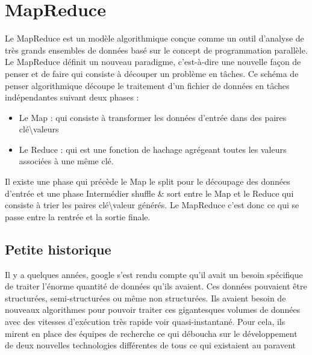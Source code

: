 \section{MapReduce}



Le MapReduce est un modèle algorithmique conçue comme un outil d’analyse de très grands ensembles de données basé sur le concept de programmation parallèle. Le MapReduce définit un nouveau paradigme, c’est-à-dire une nouvelle façon de penser et de faire qui consiste à découper un problème en tâches. Ce schéma de penser algorithmique découpe le traitement d’un fichier de données en tâches indépendantes suivant deux phases :  
\begin{itemize}
    \item Le Map : qui consiste à transformer les données d’entrée dans des paires clé\textbackslash valeurs
    \item Le Reduce : qui est une fonction de hachage agrégeant toutes les valeurs associées à une même clé. 
\end{itemize}

Il existe une phase qui précède le Map le split pour le découpage des données d’entrée et une phase Intermédier shuffle \& sort entre le Map et le Reduce qui consiste à trier les paires clé\textbackslash valeur générés. Le MapReduce c’est donc ce qui se passe entre la rentrée et la sortie finale. \cite{chokogoue_livre_nodate, sardar_partition_2018}

\subsection{Petite historique} 

Il y a quelques années, google s’est rendu compte qu’il avait un besoin spécifique de traiter l’énorme quantité de données qu’ils avaient. Ces données pouvaient être structurées, semi-structurées ou même non structurées. Ils avaient besoin de nouveaux algorithmes pour pouvoir traiter ces gigantesques volumes de données avec des vitesses d’exécution très rapide voir quasi-instantané. Pour cela, ils mirent en place des équipes de recherche ce qui déboucha sur le développement de deux nouvelles technologies différentes de tous ce qui existaient au paravent 

